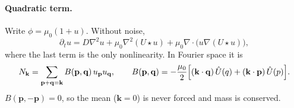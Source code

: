 \documentclass[11pt]{article}
\newcommand{\Uh}{\hat U}
\begin{document}
\paragraph{Quadratic term.} Write $\phi=\mu_0(1+u)$. Without noise,
\begin{equation}
  \partial_t u = D\nabla^2u + \mu_0\nabla^2(U\star u)
     + \mu_0\nabla\cdot\bigl(u\nabla(U\star u)\bigr),
\end{equation}
where the last term is the only nonlinearity. In Fourier space it is
\begin{equation}
  N_{\mathbf k} = \sum_{\mathbf p+\mathbf q=\mathbf k} B(\mathbf p,\mathbf q)\,u_{\mathbf p}u_{\mathbf q},
  \qquad
  B(\mathbf p,\mathbf q) = -\frac{\mu_0}{2}\Bigl[(\mathbf k\cdot\mathbf q)\,\Uh(q)
     + (\mathbf k\cdot\mathbf p)\,\Uh(p)\Bigr].
\end{equation}
$B(\mathbf p,-\mathbf p)=0$, so the mean ($\mathbf k=0$) is never forced and
mass is conserved.
\end{document}

